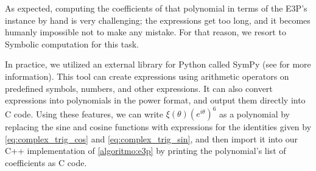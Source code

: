 As expected, computing the coefficients of that polynomial in terms of the E3P's instance by hand is very challenging; the expressions get too long, and it becomes humanly impossible not to make any mistake. 
For that reason, we resort to Symbolic computation for this task.

In practice, we utilized an external library for Python called SymPy (see  for more information).
This tool can create expressions using arithmetic operators on predefined symbols, numbers, and other expressions. It can also convert expressions into polynomials in the power format, and output them directly into C code. Using these features, we can write $\xi(\theta)(e^{i\theta})^6$ as a polynomial by replacing the sine and cosine functions with expressions for the identities given by  \autoref{eq:complex_trig_cos} and \autoref{eq:complex_trig_sin}, and then import it into our C++ implementation of \autoref{algoritmo:e3p} by printing the polynomial's list of coefficients as C code.








